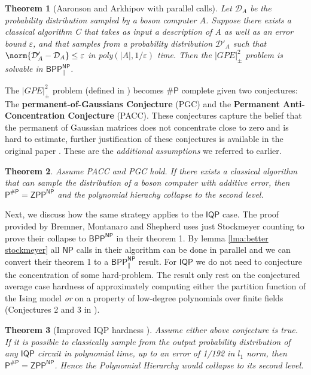 \documentclass{article}
\newtheorem{theorem}{Theorem}
\begin{document}
\begin{theorem}[Aaronson and Arkhipov with parallel calls]
    Let $\mathcal{D}_A$ be the probability distribution sampled by a boson computer $A$. Suppose there exists a classical algorithm C that takes as input a description of A as well as an error bound $\varepsilon$, and that samples from a probability distribution $\mathcal{D}'_A$ such that $\norm{\mathcal{D}'_A - \mathcal{D}_A}\leq \varepsilon$ in poly$(|A|, 1/\varepsilon)$ time. Then the $|GPE|^2_{\pm}$ problem is solvable in $\mathsf{BPP^{NP}_{\parallel}}$.
\end{theorem}

The $|GPE|^2_{\pm}$ problem (defined in \cite{aaronson2011computational}) becomes $\mathsf{\# P}$ complete given two conjectures: The \textbf{permanent-of-Gaussians Conjecture} (PGC) and the \textbf{Permanent Anti-Concentration Conjecture} (PACC). These conjectures capture the belief that the permanent of Gaussian matrices does not concentrate close to zero and is hard to estimate, further justification of these conjectures is available in the original paper \cite{aaronson2011computational}. These are the \textit{additional assumptions} we referred to earlier.

\begin{theorem}
Assume PACC and PGC hold. If there exists a classical algorithm that can sample the distribution of a boson computer with additive error, then $\mathsf{P^{\# P} = ZPP^{NP}}$ and the polynomial hierachy collapse to the second level.
\end{theorem}

Next, we discuss how the same strategy applies to the $\mathsf{IQP}$ case. The proof provided by Bremner, Montanaro and Shepherd uses just Stockmeyer counting to prove their collapse to $\mathsf{BPP^{NP}}$ in their theorem 1. 
By lemma \ref{lma:better stockmeyer} all $\mathsf{NP}$ calls in their algorithm can be done in parallel and we can convert their theorem 1 to a $\mathsf{BPP^{NP}_{\parallel}}$ result. For $\mathsf{IQP}$ we do not need to conjecture the concentration of some hard-problem. The result only rest on the conjectured average case hardness of approximately computing either the partition function of the Ising model \textit{or} on a property of low-degree polynomials over finite fields (Conjectures 2 and 3 in \cite{bremner2016average}).

\begin{theorem}[Improved IQP hardness \cite{bremner2016average}]
Assume either above conjecture is true. If it is possible to classically sample from the output probability distribution of any $\mathsf{IQP}$ circuit in polynomial time, up to an error of 1/192 in $l_1$ norm, then $\mathsf{P^{\#P}}=\mathsf{ZPP^{NP}}$. Hence the Polynomial Hierarchy would collapse to its second level.
\end{theorem}
\end{document}
